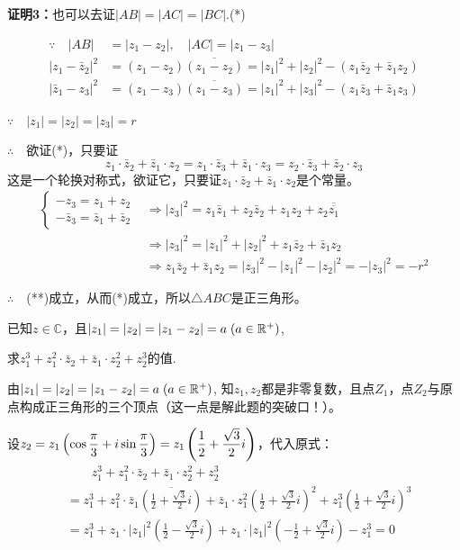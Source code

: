 \textbf{证明3：}也可以去证$|AB|=|AC|=|BC|$.\hfill (*)

\[\begin{split}
    \because\quad |AB|&=|z_1-z_2|,\quad |AC|=|z_1-z_3|\\
|z_1-\bar z_2|^2&=(z_1-z_2)\overline{(z_1-z_2)}=|z_1|^2+|z_2|^2-(z_1\bar z_2+\bar z_1z_2)\\
|\bar z_1-z_3|^2&=(z_1-z_3)\overline{(z_1-z_3)}=|z_1|^2+|z_3|^2-(z_1\bar z_3+\bar z_1z_3)    
\end{split}\]

$\because\quad |z_1|=|z_2|=|z_3|=r$

$\therefore\quad$欲证(*)，只要证
\begin{equation}
 z_1\cdot \bar z_2+\bar z_1\cdot z_2=z_1\cdot \bar z_3+\bar z_1\cdot z_3=z_2\cdot \bar z_3+\bar z_2\cdot z_3 \tag{**} 
\end{equation}
这是一个轮换对称式，欲证它，只要证$z_1\cdot \bar z_2+\bar z_1\cdot z_2$是个常量。
\[\begin{split}
\begin{cases}
    -z_3=z_1+z_2\\
    -\bar z_3=\bar z_1+\bar z_2
\end{cases}&\Rightarrow |z_3|^2 =z_1\bar z_1+z_2\bar z_2+z_1 z_2+z_2\overline{\overline{z_1}}\\
&\Rightarrow |z_3|^2 =|z_1|^2+|z_2|^2+z_1 \bar z_2+\bar z_1 z_2\\
&\Rightarrow z_1 \bar z_2+\bar z_1 z_2=|z_3|^2-|z_1|^2-|z_2|^2=-|z_3|^2=-r^2
\end{split}\]

$\therefore\quad $(**)成立，从而(*)成立，所以$\triangle ABC$是正三角形。


\begin{example}
 已知$z\in\mathbb{C}$，且$|z_1|=|z_2|=|z_1-z_2|=a\; (a\in\mathbb{R}^+)$,

 求$z^3_1+z^2_1\cdot \bar z_2+\bar z_1\cdot z^2_2+z^3_2$的值.
\end{example}

\begin{analyze}
由$|z_1|=|z_2|=|z_1-z_2|=a\; (a\in\mathbb{R}^+)$, 知$z_1,z_2$都是非零复数，且点$Z_1$，点$Z_2$与原点构成正三角形的三个顶点（这一点是解此题的突破口！）。 
\end{analyze}

\begin{solution}
设$z_2=z_1\left(\cos\dfrac{\pi}{3}+i\sin\dfrac{\pi}{3}\right)=z_1\left(\dfrac{1}{2}+\dfrac{\sqrt{3}}{2}i\right)$，代入原式：
\[\begin{split}
    &\qquad z^3_1+z^2_1\cdot \bar z_2+\bar z_1\cdot z^2_2+z^3_2\\
    &=z^3_1+z^2_1\cdot \bar z_1\overline{\left(\frac{1}{2}+\frac{\sqrt{3}}{2}i\right)}+\bar z_1\cdot z^2_1\left(\frac{1}{2}+\frac{\sqrt{3}}{2}i\right)^2+z^3_1\left(\frac{1}{2}+\frac{\sqrt{3}}{2}i\right)^3\\
    &=z^3_1+z_1\cdot |z_1|^2\left(\frac{1}{2}-\frac{\sqrt{3}}{2}i\right)+z_1\cdot |z_1|^2\left(-\frac{1}{2}+\frac{\sqrt{3}}{2}i\right)-z^3_1=0
\end{split}\]
\end{solution}

